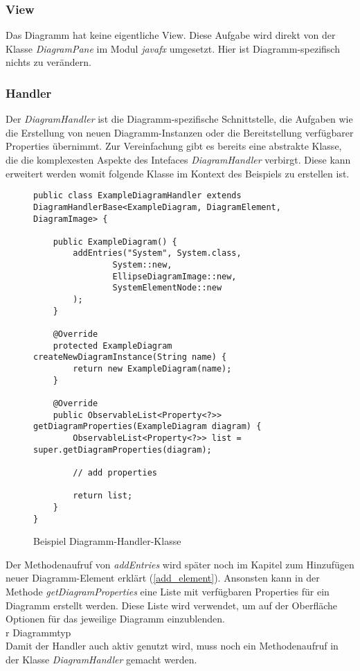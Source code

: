 \subsubsection{View}
Das Diagramm hat keine eigentliche View. Diese Aufgabe wird direkt von der Klasse \textit{DiagramPane} im Modul 
\textit{javafx} umgesetzt. Hier ist Diagramm-spezifisch nichts zu verändern.

\subsubsection{Handler}
Der \textit{DiagramHandler} ist die Diagramm-spezifische Schnittstelle, die Aufgaben wie die Erstellung von neuen
Diagramm-Instanzen oder die Bereitstellung verfügbarer Properties übernimmt. Zur Vereinfachung gibt es bereits eine
abstrakte Klasse, die die komplexesten Aspekte des Intefaces \textit{DiagramHandler} verbirgt. Diese kann erweitert
werden womit folgende Klasse im Kontext des Beispiels zu erstellen ist.

\begin{figure}[h!]
	\centering
	\begin{lstlisting}
public class ExampleDiagramHandler extends DiagramHandlerBase<ExampleDiagram, DiagramElement, DiagramImage> {

    public ExampleDiagram() {
        addEntries("System", System.class,
                System::new,
                EllipseDiagramImage::new,
                SystemElementNode::new
        );
    }

    @Override
    protected ExampleDiagram createNewDiagramInstance(String name) {
        return new ExampleDiagram(name);
    }
    
    @Override
    public ObservableList<Property<?>> getDiagramProperties(ExampleDiagram diagram) {
        ObservableList<Property<?>> list = super.getDiagramProperties(diagram);

		// add properties

        return list;
    }
}
	\end{lstlisting}
	\label{diagram_handler}
	\caption{Beispiel Diagramm-Handler-Klasse}
\end{figure}
Der Methodenaufruf von \textit{addEntries} wird später noch im Kapitel zum Hinzufügen neuer Diagramm-Element
erklärt (\ref{add_element}). Ansonsten kann in der Methode \textit{getDiagramProperties} eine Liste mit verfügbaren
Properties für ein Diagramm erstellt werden. Diese Liste wird verwendet, um auf der Oberfläche Optionen für das
jeweilige Diagramm einzublenden.
\\r Diagrammtyp
\\
Damit der Handler auch aktiv genutzt wird, muss noch ein Methodenaufruf in der Klasse \textit{DiagramHandler} gemacht
werden.

